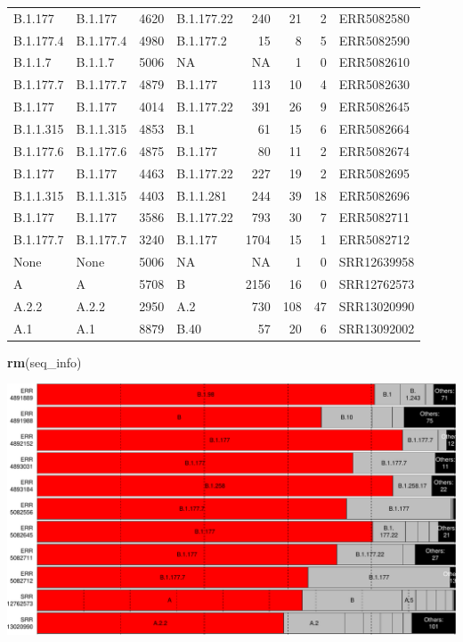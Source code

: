 \documentclass[
]{article}
\newenvironment{Shaded}{\begin{snugshade}}{\end{snugshade}}
\newcommand{\KeywordTok}[1]{\textcolor[rgb]{0.13,0.29,0.53}{\textbf{#1}}}
\newcommand{\NormalTok}[1]{#1}
\begin{document}
\begin{longtable}[]{@{}llrlrrrl@{}}
B.1.177 & B.1.177 & 4620 & B.1.177.22 & 240 & 21 & 2 &
ERR5082580\tabularnewline
B.1.177.4 & B.1.177.4 & 4980 & B.1.177.2 & 15 & 8 & 5 &
ERR5082590\tabularnewline
B.1.1.7 & B.1.1.7 & 5006 & NA & NA & 1 & 0 & ERR5082610\tabularnewline
B.1.177.7 & B.1.177.7 & 4879 & B.1.177 & 113 & 10 & 4 &
ERR5082630\tabularnewline
B.1.177 & B.1.177 & 4014 & B.1.177.22 & 391 & 26 & 9 &
ERR5082645\tabularnewline
B.1.1.315 & B.1.1.315 & 4853 & B.1 & 61 & 15 & 6 &
ERR5082664\tabularnewline
B.1.177.6 & B.1.177.6 & 4875 & B.1.177 & 80 & 11 & 2 &
ERR5082674\tabularnewline
B.1.177 & B.1.177 & 4463 & B.1.177.22 & 227 & 19 & 2 &
ERR5082695\tabularnewline
B.1.1.315 & B.1.1.315 & 4403 & B.1.1.281 & 244 & 39 & 18 &
ERR5082696\tabularnewline
B.1.177 & B.1.177 & 3586 & B.1.177.22 & 793 & 30 & 7 &
ERR5082711\tabularnewline
B.1.177.7 & B.1.177.7 & 3240 & B.1.177 & 1704 & 15 & 1 &
ERR5082712\tabularnewline
None & None & 5006 & NA & NA & 1 & 0 & SRR12639958\tabularnewline
A & A & 5708 & B & 2156 & 16 & 0 & SRR12762573\tabularnewline
A.2.2 & A.2.2 & 2950 & A.2 & 730 & 108 & 47 & SRR13020990\tabularnewline
A.1 & A.1 & 8879 & B.40 & 57 & 20 & 6 & SRR13092002\tabularnewline
\bottomrule
\end{longtable}

\begin{Shaded}
\begin{Highlighting}[]
\KeywordTok{rm}\NormalTok{(seq\_info)}
\end{Highlighting}
\end{Shaded}

\includegraphics{pangolin_results_report_d_files/figure-latex/pareto-1.pdf}
\end{document}
